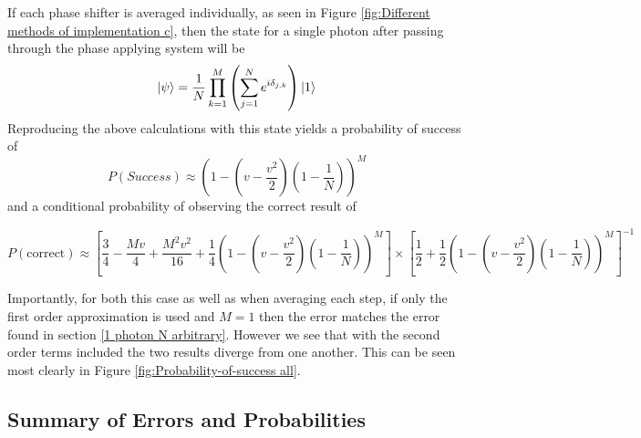 \documentclass[aps,pra,twocolumn,superscriptaddress,numerical,floatfix]{revtex4-1}
\begin{document}
If each phase shifter is averaged individually, as seen in Figure \ref{fig:Different methods of implementation c}, then the state for a single photon after passing through the phase applying system will be
\begin{equation}
	\ket{\psi}=\frac{1}{N}\prod_{k=1}^{M}\left(\sum_{j=1}^{N}e^{i\delta_{j,k}}\right)\ket{1}\label{eq:AveStepPhaseState}
\end{equation}
Reproducing the above calculations with this state yields a probability of success of
\begin{equation}
P\left(Success\right)\approx\left(1-\left(v-\frac{v^{2}}{2}\right)\left(1-\frac{1}{N}\right)\right)^{M}\label{eq:AvStepProbSuccess}
\end{equation}
and a conditional probability of observing the correct result of
\begin{widetext}
\begin{equation}
P(\textrm{correct}) \approx  \left[\frac{3}{4}-\frac{Mv}{4}+\frac{M^{2}v^{2}}{16}+\frac{1}{4}\left(1-\left(v-\frac{v^{2}}{2}\right)\left(1-\frac{1}{N}\right)\right)^{M}\right]\nonumber\times\left[\frac{1}{2}+\frac{1}{2}\left(1-\left(v-\frac{v^{2}}{2}\right)\left(1-\frac{1}{N}\right)\right)^{M}\right]^{-1}\label{eq:ErrorAvStep}
\end{equation}
\end{widetext}
Importantly, for both this case as well as when averaging each step, if only the first order approximation is used and $M=1$ then the error matches the error found in section \ref{1 photon N arbitrary}. However we see that with the second order terms included the two results diverge from one another. This can be seen most clearly in Figure \ref{fig:Probability-of-success all}.

\subsection{Summary of Errors and Probabilities\label{Summary of Errors and Probabilities}}
\end{document}
